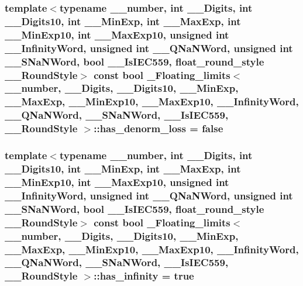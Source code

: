 \subsubsection[{has\+\_\+denorm\+\_\+loss}]{\setlength{\rightskip}{0pt plus 5cm}template$<$typename \+\_\+\+\_\+number, int \+\_\+\+\_\+\+Digits, int \+\_\+\+\_\+\+Digits10, int \+\_\+\+\_\+\+Min\+Exp, int \+\_\+\+\_\+\+Max\+Exp, int \+\_\+\+\_\+\+Min\+Exp10, int \+\_\+\+\_\+\+Max\+Exp10, unsigned int \+\_\+\+\_\+\+Infinity\+Word, unsigned int \+\_\+\+\_\+\+Q\+Na\+N\+Word, unsigned int \+\_\+\+\_\+\+S\+Na\+N\+Word, bool \+\_\+\+\_\+\+Is\+I\+E\+C559, float\+\_\+round\+\_\+style \+\_\+\+\_\+\+Round\+Style$>$ const {\bf bool} {\bf \+\_\+\+Floating\+\_\+limits}$<$ \+\_\+\+\_\+number, \+\_\+\+\_\+\+Digits, \+\_\+\+\_\+\+Digits10, \+\_\+\+\_\+\+Min\+Exp, \+\_\+\+\_\+\+Max\+Exp, \+\_\+\+\_\+\+Min\+Exp10, \+\_\+\+\_\+\+Max\+Exp10, \+\_\+\+\_\+\+Infinity\+Word, \+\_\+\+\_\+\+Q\+Na\+N\+Word, \+\_\+\+\_\+\+S\+Na\+N\+Word, \+\_\+\+\_\+\+Is\+I\+E\+C559, \+\_\+\+\_\+\+Round\+Style $>$\+::has\+\_\+denorm\+\_\+loss = {\bf false}\hspace{0.3cm}{\ttfamily [static]}}\label{class__Floating__limits_ad035ac78d3f3c86f752002d807f0aafe}
\hypertarget{class__Floating__limits_a51a9b40a410fe6523829df82946f9977}{}
\subsubsection[{has\+\_\+infinity}]{\setlength{\rightskip}{0pt plus 5cm}template$<$typename \+\_\+\+\_\+number, int \+\_\+\+\_\+\+Digits, int \+\_\+\+\_\+\+Digits10, int \+\_\+\+\_\+\+Min\+Exp, int \+\_\+\+\_\+\+Max\+Exp, int \+\_\+\+\_\+\+Min\+Exp10, int \+\_\+\+\_\+\+Max\+Exp10, unsigned int \+\_\+\+\_\+\+Infinity\+Word, unsigned int \+\_\+\+\_\+\+Q\+Na\+N\+Word, unsigned int \+\_\+\+\_\+\+S\+Na\+N\+Word, bool \+\_\+\+\_\+\+Is\+I\+E\+C559, float\+\_\+round\+\_\+style \+\_\+\+\_\+\+Round\+Style$>$ const {\bf bool} {\bf \+\_\+\+Floating\+\_\+limits}$<$ \+\_\+\+\_\+number, \+\_\+\+\_\+\+Digits, \+\_\+\+\_\+\+Digits10, \+\_\+\+\_\+\+Min\+Exp, \+\_\+\+\_\+\+Max\+Exp, \+\_\+\+\_\+\+Min\+Exp10, \+\_\+\+\_\+\+Max\+Exp10, \+\_\+\+\_\+\+Infinity\+Word, \+\_\+\+\_\+\+Q\+Na\+N\+Word, \+\_\+\+\_\+\+S\+Na\+N\+Word, \+\_\+\+\_\+\+Is\+I\+E\+C559, \+\_\+\+\_\+\+Round\+Style $>$\+::has\+\_\+infinity = {\bf true}\hspace{0.3cm}{\ttfamily [static]}}\label{class__Floating__limits_a51a9b40a410fe6523829df82946f9977}
\hypertarget{class__Floating__limits_a70a0355563c0a25e0704bd01ea336c18}{}
